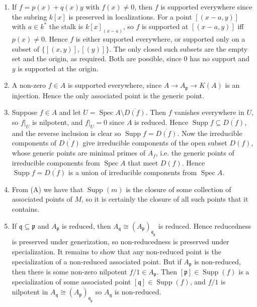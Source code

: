 \documentclass{report}
\newcommand{\closure}[1]{\overline{#1}} %
\newcommand{\p}{\mathfrak{p}}
\newcommand{\q}{\mathfrak{q}}
\DeclareMathOperator{\Supp}{Supp}
\DeclareMathOperator{\Spec}{Spec}
\begin{document}
\begin{enumerate}[label=\textbf{5.5.\Alph*.}]
	\item If $f=p(x)+q(x)y$ with $f(x)\ne0$, then $f$ is supported everywhere
	      since the subring $k[x]$ is preserved in localizations. For a point
	      $[(x-a,y)]$ with $a\in k^*$ the stalk is $k[x]_{(x-a)}$, so $f$ is
	      supported at $[(x-a,y)]$ iff $p(x)\ne0$. Hence $f$ is either supported
	      everywhere, or supported only on a subset of $\{[(x,y)],[(y)]\}$. The
	      only closed such subsets are the empty set and the origin, as required.
	      Both are possible, since 0 has no support and $y$ is supported at the
	      origin.

	\item A non-zero $f\in A$ is supported everywhere, since $A\to A_\p\to K(A)$
	      is an injection. Hence the only associated point is the generic point.

	\item Suppose $f\in A$ and let $U=\Spec A\setminus\closure{D(f)}$. Then $f$
	      vanishes everywhere in $U$, so $f|_U$ is nilpotent, and $f|_U=0$ since
	      $A$ is reduced. Hence $\Supp f\subseteq\closure{D(f)}$, and the reverse
	      inclusion is clear so $\Supp f=\closure{D(f)}$. Now the irreducible
	      components of $\closure{D(f)}$ give irreducible components of the open
	      subset $D(f)$, whose generic points are minimal primes of $A_f$, i.e.
	      the generic points of irreducible components from $\Spec A$ that meet
	      $D(f)$. Hence $\Supp f=\closure{D(f)}$ is a union of irreducible
	      components from $\Spec A$.

	\item From (A) we have that $\Supp(m)$ is the closure of some collection of
	      associated points of $M$, so it is certainly the closure of all such
	      points that it contains.

	\item If $\q\subseteq\p$ and $A_\p$ is reduced, then
	      $A_\q\cong(A_\p)_{\q_\p}$ is reduced. Hence reducedness is preserved
	      under generization, so non-reducedness is preserved under
	      specialization. It remains to show that any non-reduced point is the
	      specialization of a non-reduced associated point. But if $A_\p$ is
	      non-reduced, then there is some non-zero nilpotent $f/1\in A_\p$. Then
	      $[\p]\in\Supp(f)$ is a specialization of some associated point
	      $[\q]\in\Supp(f)$, and $f/1$ is nilpotent in $A_\q\cong(A_\p)_{\q_\p}$
	      so $A_\q$ is non-reduced.


\end{enumerate}
\end{document}
